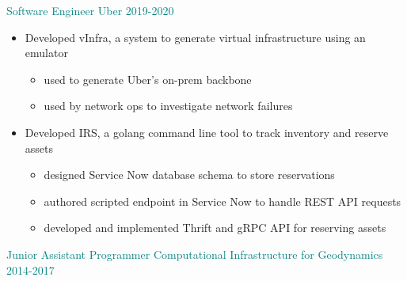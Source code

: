 \documentclass[11pt]{ltxdoc}
\begin{document}
		{\textcolor{teal}{Software Engineer} \hfill \textcolor{teal}{Uber} \hfill \textcolor{teal}{2019-2020}}
		\begin{itemize}
			\item Developed vInfra, a system to generate virtual infrastructure using an emulator
			\begin{itemize}
				\item used to generate Uber's on-prem backbone
				\item used by network ops to investigate network failures
			\end {itemize}
			
			\item Developed IRS, a golang command line tool to track inventory and reserve assets
			\begin{itemize}
				\item designed Service Now database schema to store reservations
				\item authored scripted endpoint in Service Now to handle REST API requests
				\item developed and implemented Thrift and gRPC API for reserving assets
			\end {itemize}
	 	\end{itemize}

	{\textcolor{teal}{Junior Assistant Programmer} \hfill \textcolor{teal}{Computational Infrastructure for Geodynamics} \hfill \textcolor{teal}{2014-2017}}
\end{document}
